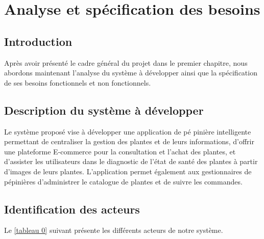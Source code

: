 \chapter{Analyse et spécification des besoins}

\section*{Introduction}
Après avoir présenté le cadre général du projet dans le premier chapitre, nous abordons maintenant l'analyse du système à développer ainsi que la spécification de ses besoins fonctionnels et non fonctionnels.

\section{Description du système à développer}

Le système proposé vise à développer une application de pé
pinière intelligente permettant de centraliser la gestion des plantes et de leurs informations, d'offrir une plateforme E-commerce pour la consultation et l'achat des plantes, et d'assister les utilisateurs dans le diagnostic de l'état de santé des plantes à partir d'images de leurs plantes. L'application permet également aux gestionnaires de pépinières d'administrer le catalogue de plantes et de suivre les commandes.

\section{Identification des acteurs}

Le \autoref{tableau 0} suivant présente les différents acteurs de notre système.

